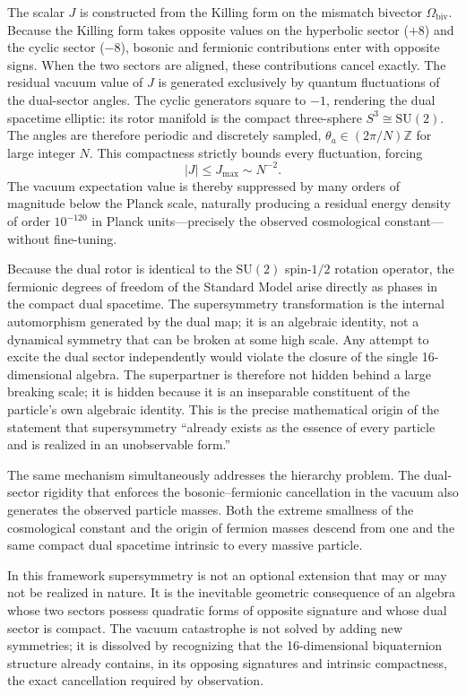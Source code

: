 \documentclass[dvipdfmx,11pt,a4paper]{article}
\begin{document}
The scalar \(J\) is constructed from the Killing form on the mismatch bivector \(\Omega_\text{biv}\). Because the Killing form takes opposite values on the hyperbolic sector (\(+8\)) and the cyclic sector (\(-8\)), bosonic and fermionic contributions enter with opposite signs. When the two sectors are aligned, these contributions cancel exactly. The residual vacuum value of \(J\) is generated exclusively by quantum fluctuations of the dual-sector angles. The cyclic generators square to \(-1\), rendering the dual spacetime elliptic: its rotor manifold is the compact three-sphere \(S^3 \cong \mathrm{SU}(2)\). The angles are therefore periodic and discretely sampled, \(\theta_a \in (2\pi/N)\mathbb{Z}\) for large integer \(N\). This compactness strictly bounds every fluctuation, forcing
\[
|J| \le J_\text{max} \sim N^{-2}.
\]
The vacuum expectation value is thereby suppressed by many orders of magnitude below the Planck scale, naturally producing a residual energy density of order \(10^{-120}\) in Planck units—precisely the observed cosmological constant—without fine-tuning.

Because the dual rotor is identical to the \(\mathrm{SU}(2)\) spin-\(1/2\) rotation operator, the fermionic degrees of freedom of the Standard Model arise directly as phases in the compact dual spacetime. The supersymmetry transformation is the internal automorphism generated by the dual map; it is an algebraic identity, not a dynamical symmetry that can be broken at some high scale. Any attempt to excite the dual sector independently would violate the closure of the single 16-dimensional algebra. The superpartner is therefore not hidden behind a large breaking scale; it is hidden because it is an inseparable constituent of the particle’s own algebraic identity. This is the precise mathematical origin of the statement that supersymmetry “already exists as the essence of every particle and is realized in an unobservable form.”

The same mechanism simultaneously addresses the hierarchy problem. The dual-sector rigidity that enforces the bosonic–fermionic cancellation in the vacuum also generates the observed particle masses. Both the extreme smallness of the cosmological constant and the origin of fermion masses descend from one and the same compact dual spacetime intrinsic to every massive particle.

In this framework supersymmetry is not an optional extension that may or may not be realized in nature. It is the inevitable geometric consequence of an algebra whose two sectors possess quadratic forms of opposite signature and whose dual sector is compact. The vacuum catastrophe is not solved by adding new symmetries; it is dissolved by recognizing that the 16-dimensional biquaternion structure already contains, in its opposing signatures and intrinsic compactness, the exact cancellation required by observation.
\end{document}
